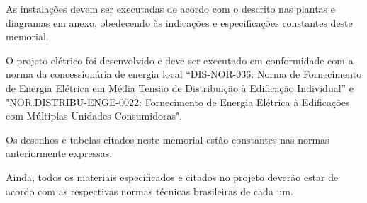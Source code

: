 As instalações devem ser executadas de acordo com o descrito nas plantas e diagramas em anexo, obedecendo às indicações e especificações constantes deste memorial. 

O projeto elétrico foi desenvolvido e deve ser executado em conformidade com a norma da concessionária de energia local “DIS-NOR-036: Norma de Fornecimento de Energia Elétrica em Média Tensão de Distribuição à Edificação Individual” e "NOR.DISTRIBU-ENGE-0022: Fornecimento de Energia Elétrica à Edificações com Múltiplas Unidades Consumidoras". 

Os desenhos e tabelas citados neste memorial estão constantes nas normas anteriormente expressas.

Ainda, todos os materiais especificados e citados no projeto deverão estar de acordo com as respectivas normas técnicas brasileiras de cada um. 




